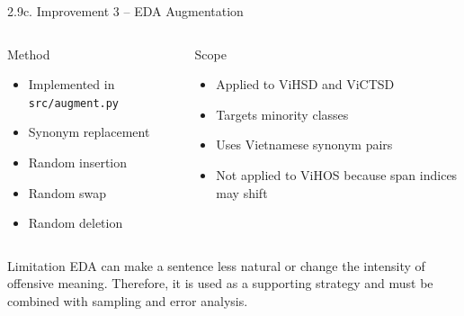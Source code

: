 \documentclass[11pt, aspectratio=169]{beamer}
\begin{document}
\begin{frame}[shrink=7]{2.9c. Improvement 3 -- EDA Augmentation}

\begin{columns}[T]
  \begin{block}{Method}
    \begin{itemize}
      \item Implemented in \texttt{src/augment.py}
      \item Synonym replacement
      \item Random insertion
      \item Random swap
      \item Random deletion
    \end{itemize}
  \end{block}

  \begin{block}{Scope}
    \begin{itemize}
      \item Applied to ViHSD and ViCTSD
      \item Targets minority classes
      \item Uses Vietnamese synonym pairs
      \item Not applied to ViHOS because span indices may shift
    \end{itemize}
  \end{block}
\end{columns}

\vspace{0.3cm}
\begin{block}{Limitation}
  EDA can make a sentence less natural or change the intensity of offensive meaning. Therefore, it is used as a supporting strategy and must be combined with sampling and error analysis.
\end{block}
\end{frame}
\end{document}

